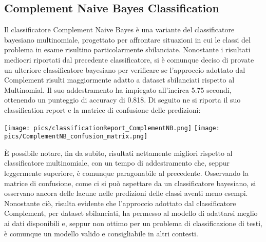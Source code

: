 \documentclass[12pt,oneside]{article}
\begin{document}
    \newpage
    \begin{enumerate}
    \subsection{Complement Naive Bayes Classification}
    \begin{justify}
        Il classificatore Complement Naive Bayes è una variante del classificatore bayesiano multinomiale, progettato per affrontare situazioni in cui le classi del problema in esame risultino particolarmente sbilanciate. Nonostante i risultati mediocri riportati dal precedente classificatore, si è comunque deciso di provate un ulteriore classificatore bayesiano per verificare se l’approccio adottato dal Complement risulti maggiormente adatto a dataset sbilanciati rispetto al Multinomial.
        Il suo addestramento ha impiegato all’incirca 5.75 secondi, ottenendo un punteggio di accuracy di 0.818. 
        Di seguito ne si riporta il suo classification report e la matrice di confusione delle predizioni:
    \end{justify}

    \centering
    \texttt{[image: pics/classificationReport\_ComplementNB.png]}
    \texttt{[image: pics/ComplementNB\_confusion\_matrix.png]}

    \begin{justify}
    È possibile notare, fin da subito, risultati nettamente migliori rispetto al classificatore multinomiale, con un tempo di addestramento che, seppur leggermente superiore, è comunque paragonabile al precedente. Osservando la matrice di confusione, come ci si può aspettare da un classificatore bayesiano, si osservano ancora delle lacune nelle predizioni delle classi aventi meno esempi. Nonostante ciò, risulta evidente che l’approccio adottato dal classificatore Complement, per dataset sbilanciati, ha permesso al modello di adattarsi meglio ai dati disponibili e, seppur non ottimo per un problema di classificazione di testi, è comunque un modello valido e consigliabile in altri contesti.
    \end{justify}
    \end{enumerate}
\end{document}

